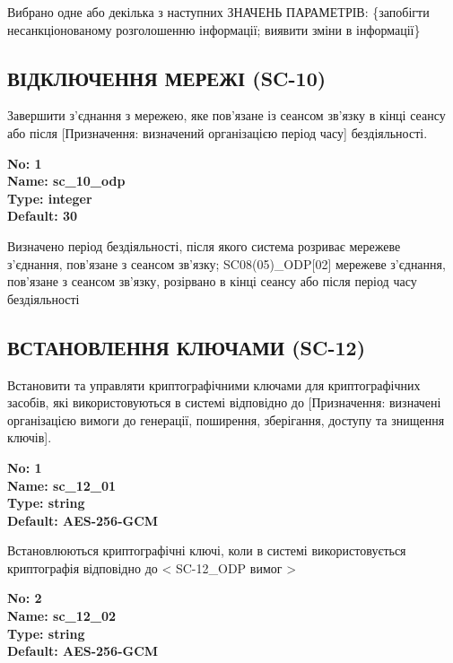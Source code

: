 \documentclass{article}
\begin{document}
{\footnotesize Вибрано одне або декілька з наступних ЗНАЧЕНЬ ПАРАМЕТРІВ: \{запобігти несанкціонованому розголошенню інформації; виявити зміни в інформації\}}




\subsection{ВІДКЛЮЧЕННЯ МЕРЕЖІ (SC-10)}
Завершити з'єднання з мережею, яке пов'язане із сеансом зв'язку в кінці сеансу або після [Призначення: визначений організацією період часу] бездіяльності.

\vspace{10pt}
{\footnotesize\bfseries
No: 1\\
Name: sc\_\allowbreak{}10\_\allowbreak{}odp\\
Type: integer\\
Default: 30
}

{\footnotesize Визначено період бездіяльності, після якого система розриває мережеве з'єднання, пов'язане з сеансом зв'язку; SC08(05)\_\allowbreak{}ODP[02] мережеве з'єднання, пов'язане з сеансом зв'язку, розірвано в кінці сеансу або після період часу бездіяльності}




\subsection{ВСТАНОВЛЕННЯ КЛЮЧАМИ (SC-12)}
Встановити та управляти криптографічними ключами для криптографічних засобів, які використовуються в системі відповідно до [Призначення: визначені організацією вимоги до генерації, поширення, зберігання, доступу та знищення ключів].

\vspace{10pt}
{\footnotesize\bfseries
No: 1\\
Name: sc\_\allowbreak{}12\_\allowbreak{}01\\
Type: string\\
Default: \textquotedbl{}AES-256-GCM\textquotedbl{}
}

{\footnotesize Встановлюються криптографічні ключі, коли в системі використовується криптографія відповідно до < SC-12\_\allowbreak{}ODP вимог >}


{\footnotesize\bfseries
No: 2\\
Name: sc\_\allowbreak{}12\_\allowbreak{}02\\
Type: string\\
Default: \textquotedbl{}AES-256-GCM\textquotedbl{}
}
\end{document}
